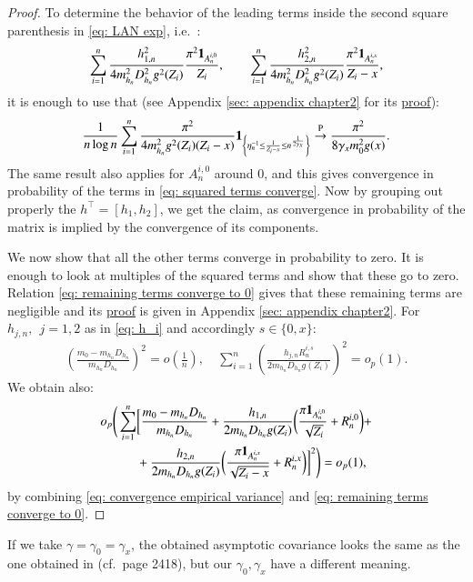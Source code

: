 \begin{proof}
To determine the behavior of the leading terms inside the second square parenthesis in \eqref{eq: LAN exp}, i.e.\ :
\begin{align}\label{eq: squared terms converge}
    \sum_{i=1}^n \frac{h^2_{1,n}}{4 m^2_{h_n} D^2_{h_n} g^2(Z_i)} \frac{\pi^2 \mathbf{1}_{A^{i,0}_n}}{Z_i}, \quad \quad \sum_{i=1}^n \frac{h^2_{2,n}}{4 m^2_{h_n} D^2_{h_n} g^2(Z_i)} \frac{\pi^2 \mathbf{1}_{A^{i,x}_n}}{Z_i -x},
\end{align}
it is enough to use that (see Appendix \ref{sec: appendix chapter2} for its \hyperlink{proof of lemma 8}{proof}):
\begin{align}\label{eq: convergence empirical variance}
\frac{1}{n\log{n}} \sum_{i=1}^{n} \frac{\pi^2}{4 m^2_{h_n} g^2(Z_i)(Z_i - x)} \ind_{\left\{ \eta_n^{-1} \leq \frac{1}{Z_i -x} \leq n^{\frac{1}{2\gamma_{\scaleto{x}{2.2pt}}}} \right\}} \stackrel{\pb}{\rightarrow} \frac{ \pi^2 }{8 \gamma_x m^2_0 g(x) }.
\end{align}
The same result also applies for $A^{i,0}_n$ around $0$, and this gives convergence in probability of the terms in \eqref{eq: squared terms converge}. Now by grouping out properly the $h^{\top} = [h_1,h_2]$, we get the claim, as convergence in probability of the matrix is implied by the convergence of its components. 

We now show that all the other terms converge in probability to zero. It is enough to look at multiples of the squared terms and show that these go to zero. Relation \eqref{eq: remaining terms converge to 0} gives that these remaining terms are negligible and its \hyperlink{proof of lemma 9}{proof} is given in Appendix \ref{sec: appendix chapter2}. For $h_{j,n}, \: \: j = 1,2$ as in \eqref{eq: h_i} and accordingly $s \in \{0,x\}$:
\begin{align}\label{eq: remaining terms converge to 0}
     \left( \frac{m_0 - m_{h_n} D_{h_n}}{m_{h_n} D_{h_n}} \right)^2 = o\left(\frac{1}{n} \right), \quad  \sum_{i=1}^n \left( \frac{h_{j,n} R_n^{i,s}}{2 m_{h_n} D_{h_n} g(Z_i)} \right)^2 = o_p (1).   
\end{align}
We obtain also:
\begin{align*}
      o_p\Bigg(\sum_{i=1}^n &\bigg[ \frac{m_0 - m_{h_n} D_{h_n}}{m_{h_n} D_{h_n}} + \frac{h_{1,n}}{2 m_{h_n} D_{h_n} g(Z_i)} \bigg(\frac{\pi \mathbf{1}_{A^{i,0}_n}}{\sqrt{Z_i}}  + R_n^{i,0} \bigg) + \\
    & + \frac{h_{2,n}}{2 m_{h_n} D_{h_n} g(Z_i)} \bigg(\frac{\pi \mathbf{1}_{A^{i,x}_n}}{\sqrt{Z_i -x}} + R_n^{i,x} \bigg) \bigg]^2 \Bigg) = o_p(1),
\end{align*}
by combining \eqref{eq: convergence empirical variance} and \eqref{eq: remaining terms converge to 0}.
\end{proof}
\begin{remark}
If we take $\gamma= \gamma_0 = \gamma_x$, the obtained asymptotic covariance looks the same as the one obtained in \cite{10} (cf.\ page 2418), but our $\gamma_0, \gamma_x$ have a different meaning. 
\end{remark}

